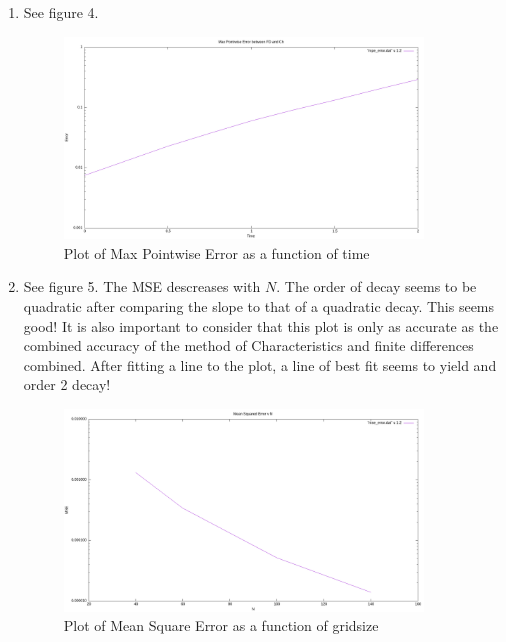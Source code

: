 \documentclass{article}
\begin{document}
\begin{enumerate}[label=\alph*)]
    \item See figure 4.
     \begin{figure}
        \centering
        \includegraphics[width=0.9\textwidth]{mpe.png}
        \caption{Plot of Max Pointwise Error as a function of time}
    \end{figure}
       
    \item See figure 5. The MSE descreases with $N$. The order of decay seems to
    be quadratic after comparing the slope to that of a quadratic decay. This
    seems good! It is also important to consider that this plot is only as
    accurate as the combined accuracy of the method of Characteristics and
    finite differences combined. After fitting a line to the plot, a line of
    best fit seems to yield and order 2 decay!
    \begin{figure}
        \centering
        \includegraphics[width=0.9\textwidth]{mse.png}
        \caption{Plot of Mean Square Error as a function of gridsize}
    \end{figure}



\end{enumerate}
\end{document}

